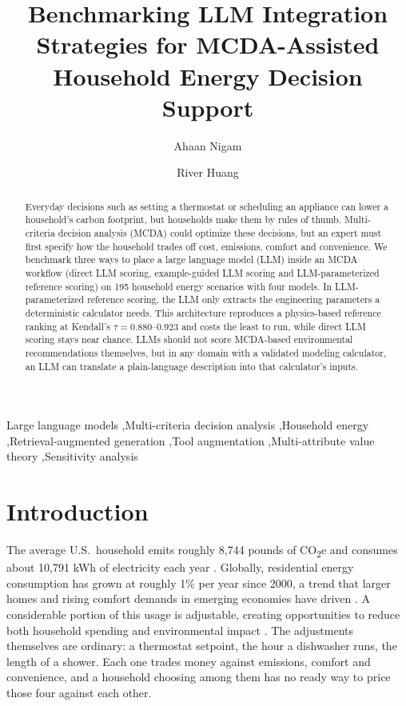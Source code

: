 \documentclass[final,3p,times]{elsarticle}
\def\corref#1{}%
\begin{document}
\begin{frontmatter}
\title{Benchmarking LLM Integration Strategies for MCDA-Assisted Household Energy Decision Support}
\author{Ahaan Nigam\corref{cor1}}
\author{River Huang}
\begin{abstract}
Everyday decisions such as setting a thermostat or scheduling an appliance can lower a household's carbon footprint, but households make them by rules of thumb. Multi-criteria decision analysis (MCDA) could optimize these decisions, but an expert must first specify how the household trades off cost, emissions, comfort and convenience. We benchmark three ways to place a large language model (LLM) inside an MCDA workflow (direct LLM scoring, example-guided LLM scoring and LLM-parameterized reference scoring) on 195 household energy scenarios with four models. In LLM-parameterized reference scoring, the LLM only extracts the engineering parameters a deterministic calculator needs. This architecture reproduces a physics-based reference ranking at Kendall's $\tau=0.880$--$0.923$ and costs the least to run, while direct LLM scoring stays near chance. LLMs should not score MCDA-based environmental recommendations themselves, but in any domain with a validated modeling calculator, an LLM can translate a plain-language description into that calculator's inputs.\end{abstract}
\begin{keyword}
Large language models \sep Multi-criteria decision analysis  \sep Household energy \sep Retrieval-augmented generation \sep Tool augmentation \sep Multi-attribute value theory \sep Sensitivity analysis
\end{keyword}
\end{frontmatter}

\section{Introduction}
\label{sec:introduction}
The average U.S.\ household emits roughly 8{,}744 pounds of CO\textsubscript{2}e and consumes about 10{,}791 kWh of electricity each year \cite{epa_household2024,eia_faq_electricity2024}. Globally, residential energy consumption has grown at roughly 1\% per year since 2000, a trend that larger homes and rising comfort demands in emerging economies have driven \cite{GONZALEZTORRES2022112428}. A considerable portion of this usage is adjustable, creating opportunities to reduce both household spending and environmental impact \cite{dietz2009}. The adjustments themselves are ordinary: a thermostat setpoint, the hour a dishwasher runs, the length of a shower. Each one trades money against emissions, comfort and convenience, and a household choosing among them has no ready way to price those four against each other.
\end{document}
